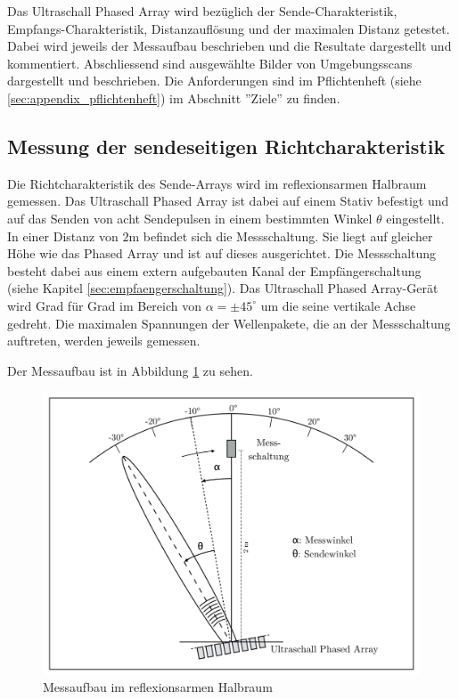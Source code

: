 Das Ultraschall Phased Array wird bezüglich der Sende-Charakteristik, Empfangs-Charakteristik, Distanzauflösung und der maximalen Distanz getestet. Dabei wird jeweils der Messaufbau beschrieben und die Resultate dargestellt und kommentiert. Abschliessend sind ausgewählte Bilder von Umgebungsscans dargestellt und beschrieben. Die Anforderungen sind im Pflichtenheft (siehe \ref{sec:appendix_pflichtenheft}) im Abschnitt ''Ziele'' zu finden.

\subsection{Messung der sendeseitigen Richtcharakteristik}\label{sec:messung_der_sendeseitigen_richtcharakteristik}
Die Richtcharakteristik des Sende-Arrays wird im reflexionsarmen Halbraum gemessen. Das Ultraschall Phased Array ist dabei auf einem Stativ befestigt und auf das Senden von acht Sendepulsen in einem bestimmten Winkel $\theta$ eingestellt. In einer Distanz von $2 \mathrm{m}$ befindet sich die Messschaltung. Sie liegt auf gleicher Höhe wie das Phased Array und ist auf dieses ausgerichtet. Die Messschaltung besteht dabei aus einem extern aufgebauten Kanal der Empfängerschaltung (siehe Kapitel \ref{sec:empfaengerschaltung}).
Das Ultraschall Phased Array-Gerät wird Grad für Grad im Bereich von $\alpha = \pm 45^{\circ}$ um die seine vertikale Achse gedreht. Die maximalen Spannungen der Wellenpakete, die an der Messschaltung auftreten, werden jeweils gemessen.

Der Messaufbau ist in Abbildung \ref{fig:image_test_messaufbau_0} zu sehen.

\begin{figure}[htb]
\includegraphics[width=\textwidth]{graphics/image_test_messaufbau_0.png}
\caption{Messaufbau im reflexionsarmen Halbraum} %
\label{fig:image_test_messaufbau_0}
\end{figure}
%


